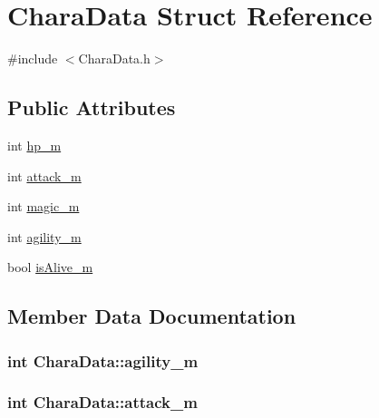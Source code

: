 \hypertarget{struct_chara_data}{}\section{Chara\+Data Struct Reference}
\label{struct_chara_data}


{\ttfamily \#include $<$Chara\+Data.\+h$>$}

\subsection*{Public Attributes}
\begin{DoxyCompactItemize}
\item 
int \hyperlink{struct_chara_data_a7186ee61c28b6a84b0c7a41524ee7d01}{hp\+\_\+m}
\item 
int \hyperlink{struct_chara_data_a329e47c82a4348e2245713aeb51eced5}{attack\+\_\+m}
\item 
int \hyperlink{struct_chara_data_ad76e5c9e2a90755979af927101ec43ac}{magic\+\_\+m}
\item 
int \hyperlink{struct_chara_data_a9105941ccdf5e5cecd7a6eacb78ad9eb}{agility\+\_\+m}
\item 
bool \hyperlink{struct_chara_data_a87b4617204eaa6cb9a683389afb0647e}{is\+Alive\+\_\+m}
\end{DoxyCompactItemize}


\subsection{Member Data Documentation}
\hypertarget{struct_chara_data_a9105941ccdf5e5cecd7a6eacb78ad9eb}{}
\subsubsection[{agility\+\_\+m}]{\setlength{\rightskip}{0pt plus 5cm}int Chara\+Data\+::agility\+\_\+m}\label{struct_chara_data_a9105941ccdf5e5cecd7a6eacb78ad9eb}
\hypertarget{struct_chara_data_a329e47c82a4348e2245713aeb51eced5}{}
\subsubsection[{attack\+\_\+m}]{\setlength{\rightskip}{0pt plus 5cm}int Chara\+Data\+::attack\+\_\+m}\label{struct_chara_data_a329e47c82a4348e2245713aeb51eced5}
\hypertarget{struct_chara_data_a7186ee61c28b6a84b0c7a41524ee7d01}{}
